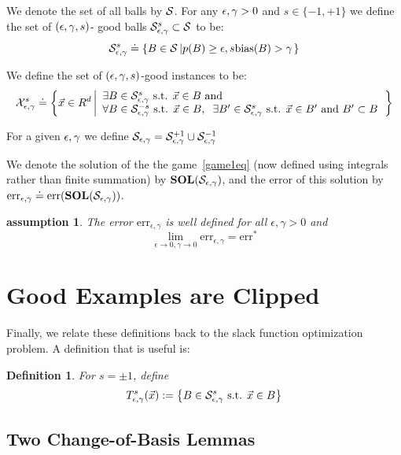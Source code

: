 \documentclass{article}
\newtheorem{assumption}[theorem]{assumption}
\newtheorem{defn}[thm]{Definition}
\newcommand{\err}{\mbox{err}}
\newcommand{\X}{{\cal X}}
\newcommand{\x}{\vec{x}}
\renewcommand{\SS}{{\cal S}}
\newcommand{\lrsetb}[1]{\left\{#1\right\}}
\newcommand{\bias}{\text{bias}}
\begin{document}
We denote the set of all balls by $\SS$. For any $\epsilon,\gamma>0$
and $s \in \{-1,+1\}$ we define the set of $(\epsilon,\gamma,s)$-
good balls $\SepsGamSig \subset \SS$ to be:
\[
\SepsGamSig \doteq \left\{B \in \SS \left| p(B) \geq \epsilon,
s \bias(B) > \edge \right. \right\}
\]

\newcommand{\XepsGamSig}{\X_{\epsilon,\edge}^{s}}
\newcommand{\XepsGam}{\X_{\epsilon,\edge}}

We define the set of $(\epsilon,\gamma,s)$-good instances to be:
\[
\XepsGamSig \doteq \left\{\x \in R^d \left|
\begin{array}{l}
\exists B \in \SepsGamSig \mbox{ s.t. } \x \in B \mbox{ and } \\
\forall B \in \SepsGamMinusSig \mbox{ s.t. } \x \in B,\;\;
\exists B' \in \SepsGamSig \mbox{ s.t. } \x \in B' \mbox{ and } B'
\subset B
\end{array}
\right. \right\}
\]

\newcommand{\sol}{{\bf SOL}}
For a given $\epsilon,\gamma$ we define $\SepsGam = \SepsGam^{+1} \cup \SepsGam^{-1}$

\newcommand{\erreg}{\err_{\epsilon,\gamma}}

We denote the solution of the the game~\ref{game1eq} (now defined
using integrals rather than finite summation) by $\sol(\SepsGam)$, and
the error of this solution by $\erreg \doteq \err(\sol(\SepsGam))$.

\begin{assumption} The error $\erreg$ is well defined for all
  $\epsilon,\gamma>0$ and
  \[
  \lim_{\epsilon \to 0, \gamma \to 0} \erreg = \err^*
  \]
\end{assumption}


\section{Good Examples are Clipped}

Finally, we relate these definitions back to the slack function optimization problem. 
A definition that is useful is:
\begin{defn}
For $s = \pm 1$, define 
\begin{align*}
T_{\epsilon, \gamma}^{s} (\x) := \lrsetb{ B \in \SepsGam^{s} \mbox{ s.t. } \x \in B}
\end{align*}
\end{defn}

\subsection{Two Change-of-Basis Lemmas}
\end{document}
